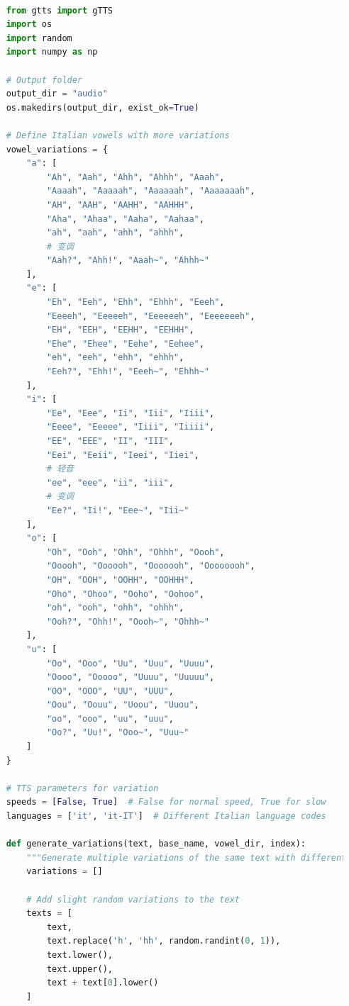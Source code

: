 \begin{lstlisting}[language=Python, caption={Audio Generation with gTTS}]

    from gtts import gTTS
    import os
    import random
    import numpy as np
    
    # Output folder
    output_dir = "audio"
    os.makedirs(output_dir, exist_ok=True)
    
    # Define Italian vowels with more variations
    vowel_variations = {
        "a": [
            "Ah", "Aah", "Ahh", "Ahhh", "Aaah",
            "Aaaah", "Aaaaah", "Aaaaaah", "Aaaaaaah",
            "AH", "AAH", "AAHH", "AAHHH",
            "Aha", "Ahaa", "Aaha", "Aahaa",
            "ah", "aah", "ahh", "ahhh",
            # 变调
            "Aah?", "Ahh!", "Aaah~", "Ahhh~"
        ],
        "e": [
            "Eh", "Eeh", "Ehh", "Ehhh", "Eeeh",
            "Eeeeh", "Eeeeeh", "Eeeeeeh", "Eeeeeeeh",
            "EH", "EEH", "EEHH", "EEHHH",
            "Ehe", "Ehee", "Eehe", "Eehee",
            "eh", "eeh", "ehh", "ehhh",
            "Eeh?", "Ehh!", "Eeeh~", "Ehhh~"
        ],
        "i": [
            "Ee", "Eee", "Ii", "Iii", "Iiii",
            "Eeee", "Eeeee", "Iiii", "Iiiii",
            "EE", "EEE", "II", "III",
            "Eei", "Eeii", "Ieei", "Iiei",
            # 轻音
            "ee", "eee", "ii", "iii",
            # 变调
            "Ee?", "Ii!", "Eee~", "Iii~"
        ],
        "o": [
            "Oh", "Ooh", "Ohh", "Ohhh", "Oooh",
            "Ooooh", "Oooooh", "Ooooooh", "Oooooooh",
            "OH", "OOH", "OOHH", "OOHHH",
            "Oho", "Ohoo", "Ooho", "Oohoo",
            "oh", "ooh", "ohh", "ohhh",
            "Ooh?", "Ohh!", "Oooh~", "Ohhh~"
        ],
        "u": [
            "Oo", "Ooo", "Uu", "Uuu", "Uuuu",
            "Oooo", "Ooooo", "Uuuu", "Uuuuu",
            "OO", "OOO", "UU", "UUU",
            "Oou", "Oouu", "Uoou", "Uuou",
            "oo", "ooo", "uu", "uuu",
            "Oo?", "Uu!", "Ooo~", "Uuu~"
        ]
    }
    
    # TTS parameters for variation
    speeds = [False, True]  # False for normal speed, True for slow
    languages = ['it', 'it-IT']  # Different Italian language codes
    
    def generate_variations(text, base_name, vowel_dir, index):
        """Generate multiple variations of the same text with different parameters"""
        variations = []
        
        # Add slight random variations to the text
        texts = [
            text,
            text.replace('h', 'hh', random.randint(0, 1)),
            text.lower(),
            text.upper(),
            text + text[0].lower()
        ]
        

\end{lstlisting}

